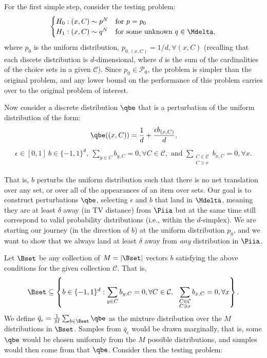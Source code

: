 \documentclass[10pt]{article}
\begin{document}
\begin{ReviewVerbatim}
For the first simple step, consider the testing problem:
	\begin{align}
	\label{eq:test2}
	\begin{cases}
	H_0: (x, C) \sim p^N & \text{for } p = p_0 \\
	H_1: (x,C) \sim q^N & \text{for some unknown } q \in \Mdelta,
	\end{cases}
	\end{align}
	where $p_0$ is the uniform distribution, $p_{0,(x,C)} = 1/d, \forall (x,C)$ (recalling that each discete distribution is $d$-dimensional, where $d$ is the sum of the cardinalities of the choice sets in a given $\mathcal C$). Since $p_0 \in \mathcal{P}_0$, the problem is simpler than the original problem, and any lower bound on the performance of this problem carries over to the original problem of interest.

	Now consider a discrete distribution $\qbe$ that is a perturbation of the uniform distribution of the form:
	\begin{align*}
	\qbe((x,C)) = \frac{1}{d} + \frac{\epsilon b_{(x,C)}}{d},
	\end{align*}
	\begin{align*}
	\epsilon \in [0,1] \
	b \in \lbrace -1, 1 \rbrace^d,
	\
	\sum_{y \in C} b_{y,C} = 0, \forall C \in \mathcal C,
	\text{ and }
	\sum_{\substack{C \in \mathcal{C}\\ C \ni x}} b_{x,C} = 0, \forall x.
	\end{align*}

	That is, $b$ perturbs the uniform distribution such that there is no net translation over any set, or over all of the appearances of an item over sets. Our goal is to construct perturbations $\qbe$, selecting $\epsilon$ and $b$ that land in $\Mdelta$, meaning they are at least $\delta$ away (in TV distance) from $\Piia$ but at the same time still correspond to valid probability distributions (i.e., within the $d$-simplex). We are starting our journey (in the direction of $b$) at the uniform distribution $p_0$, and we want to show that we always land at least $\delta$ away from {\it any} distribution in $\Piia$.

	Let $\Bset$ be any collection of $M=|\Bset|$ vectors $b$ satisfying the above conditions for the given collection $\mathcal C$. That is,
	\begin{align}
	\label{eq:bset_full}
	\Bset \subseteq
	\left \{
	b \in \lbrace -1, 1 \rbrace^d
	:
	\sum_{y \in C} b_{y,C} = 0, \forall C \in \mathcal C,
	\ \
	\sum_{\substack{C \in \mathcal{C}\\ C \ni x}} b_{x,C} = 0, \forall x
	\right \}.
	\end{align}
	We define $\bar{q}_\epsilon = \frac{1}{M} \sum_{b \in \Bset} \qbe$ as the mixture distribution over the $M$ distributions in $\Bset$. Samples from $\bar{q}_\epsilon$ would be drawn marginally, that is, some $\qbe$ would be chosen uniformly from the $M$ possible distributions, and samples would then come from that $\qbe$. Consider then the testing problem:
\end{ReviewVerbatim}
\end{document}
